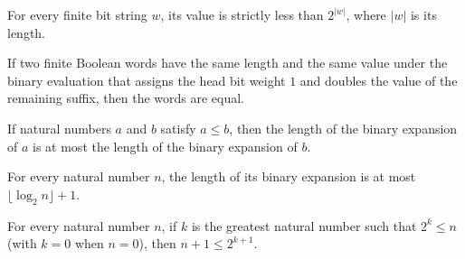 \begin{lemma}
\label{Complexity.LogProg.bitsVal_lt_two_pow}
\leanok
{}
For every finite bit string $w$, its value is strictly less than $2^{|w|}$, where $|w|$
is its length.
\end{lemma}

\begin{lemma}
\label{Complexity.LogProg.eq_of_bitsVal_eq}
\leanok
{}
If two finite Boolean words have the same length and the same value under the binary
evaluation that assigns the head bit weight $1$ and doubles the value of the remaining
suffix, then the words are equal.
\end{lemma}

\begin{lemma}
\label{Complexity.LogProg.length_bits_mono}
\leanok
{}
If natural numbers $a$ and $b$ satisfy $a\le b$, then the length of the binary expansion
of $a$ is at most the length of the binary expansion of $b$.
\end{lemma}

\begin{lemma}
\label{Complexity.LogProg.length_bits_le_log}
\leanok
{}
For every natural number $n$, the length of its binary expansion is at most
$\lfloor\log_2 n\rfloor+1$.
\end{lemma}

\begin{lemma}
\label{Complexity.LogProg.succ_le_two_pow_log}
\leanok
{}
For every natural number $n$, if $k$ is the greatest natural number such that $2^k\le n$
(with $k=0$ when $n=0$), then $n+1\le 2^{k+1}$.
\end{lemma}
